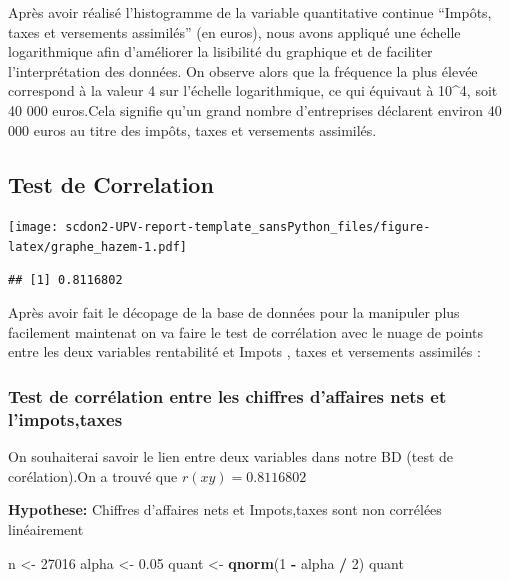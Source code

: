 \documentclass[mstat,12pt]{unswthesis}
\newenvironment{Shaded}{\begin{snugshade}}{\end{snugshade}}
\newcommand{\DecValTok}[1]{\textcolor[rgb]{0.00,0.00,0.81}{#1}}
\newcommand{\FloatTok}[1]{\textcolor[rgb]{0.00,0.00,0.81}{#1}}
\newcommand{\FunctionTok}[1]{\textcolor[rgb]{0.13,0.29,0.53}{\textbf{#1}}}
\newcommand{\NormalTok}[1]{#1}
\newcommand{\OtherTok}[1]{\textcolor[rgb]{0.56,0.35,0.01}{#1}}
\newcommand{\SpecialCharTok}[1]{\textcolor[rgb]{0.81,0.36,0.00}{\textbf{#1}}}
\begin{document}
Après avoir réalisé l'histogramme de la variable quantitative continue
``Impôts, taxes et versements assimilés'' (en euros), nous avons
appliqué une échelle logarithmique afin d'améliorer la lisibilité du
graphique et de faciliter l'interprétation des données. On observe alors
que la fréquence la plus élevée correspond à la valeur 4 sur l'échelle
logarithmique, ce qui équivaut à 10\^{}4, soit 40 000 euros.Cela
signifie qu'un grand nombre d'entreprises déclarent environ 40 000 euros
au titre des impôts, taxes et versements assimilés.

\subsection{Test de Correlation}\label{test-de-correlation}

\medskip

\texttt{[image: scdon2-UPV-report-template\_sansPython\_files/figure-latex/graphe\_hazem-1.pdf]}

\begin{verbatim}
## [1] 0.8116802
\end{verbatim}

\medskip

Après avoir fait le décopage de la base de données pour la manipuler
plus facilement maintenat on va faire le test de corrélation avec le
nuage de points entre les deux variables rentabilité et Impots , taxes
et versements assimilés :

\medskip

\subsubsection{Test de corrélation entre les chiffres d'affaires nets et
l'impots,taxes}\label{test-de-corruxe9lation-entre-les-chiffres-daffaires-nets-et-limpotstaxes}

\medskip

On souhaiterai savoir le lien entre deux variables dans notre BD (test
de corélation).On a trouvé que \(r(xy)=0.8116802\)

\medskip

\textbf{Hypothese:} Chiffres d'affaires nets et Impots,taxes sont non
corrélées linéairement

\medskip

\begin{Shaded}
\begin{Highlighting}[]
\NormalTok{n }\OtherTok{\textless{}{-}} \DecValTok{27016}
\NormalTok{alpha }\OtherTok{\textless{}{-}} \FloatTok{0.05}
\NormalTok{quant }\OtherTok{\textless{}{-}} \FunctionTok{qnorm}\NormalTok{(}\DecValTok{1} \SpecialCharTok{{-}}\NormalTok{ alpha }\SpecialCharTok{/} \DecValTok{2}\NormalTok{)}
\NormalTok{quant}
\end{Highlighting}
\end{Shaded}
\end{document}
